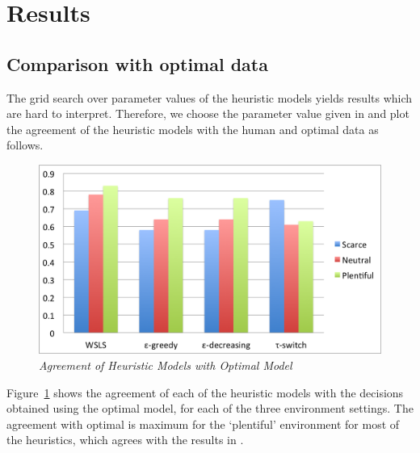 \section{Results}
\label{results}

\subsection{Comparison with optimal data}

The grid search over parameter values of the heuristic models yields results which are hard to interpret. Therefore, we choose the parameter value given in \cite{shunan2011} and plot the agreement of the heuristic models with the human and optimal data as follows.

\begin{figure}[h]
\begin{center}
\includegraphics[scale=0.5]{optimalVsHeuristicNoTitle}
\caption{\small \sl \label{plot1} Agreement of Heuristic Models with Optimal Model}
\end{center}
\end{figure}

Figure~\ref{plot1} shows the agreement of each of the heuristic models with the decisions obtained using the optimal model, for each of the three environment settings. The agreement with optimal is maximum for the `plentiful' environment for most of the heuristics, which agrees with the results in \cite{shunan2011}.

